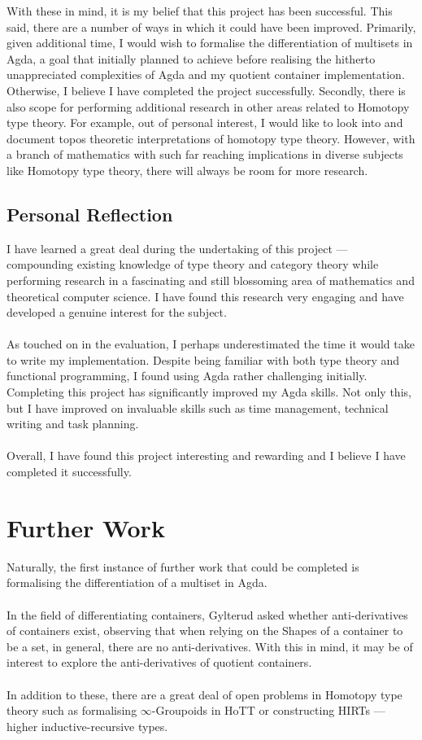 \documentclass[12pt]{report}
\begin{document}
 With these in mind, it is my belief that this project has been successful. This said, there are a number of ways in which it could have been improved. Primarily, given additional time, I would wish to formalise the differentiation of multisets in Agda, a goal that initially planned to achieve before realising the hitherto unappreciated complexities of Agda and my quotient container implementation. Otherwise, I believe I have completed the project successfully. Secondly, there is also scope for performing additional research in other areas related to Homotopy type theory. For example, out of personal interest, I would like to look into and document topos theoretic interpretations of homotopy type theory. However, with a branch of mathematics with such far reaching implications in diverse subjects like Homotopy type theory, there will always be room for more research.

\section{Personal Reflection}
I have learned a great deal during the undertaking of this project --- compounding existing knowledge of type theory and category theory while performing research in a fascinating and still blossoming area of mathematics and theoretical computer science. I have found this research very engaging and have developed a genuine interest for the subject.\\
\\
As touched on in the evaluation, I perhaps underestimated the time it would take to write my implementation. Despite being familiar with both type theory and functional programming, I found using Agda rather challenging initially. Completing this project has significantly improved my Agda skills. Not only this, but I have improved on invaluable skills such as time management, technical writing and task planning.\\
\\
Overall, I have found this project interesting and rewarding and I believe I have completed it successfully.

\chapter{Further Work}
Naturally, the first instance of further work that could be completed is formalising the differentiation of a multiset in Agda. \\
\\
In the field of differentiating containers, Gylterud asked whether anti-derivatives of containers exist, observing that when relying on the Shapes of a container to be a set, in general, there are no anti-derivatives. With this in mind, it may be of interest to explore the anti-derivatives of quotient containers.\\
\\
In addition to these, there are a great deal of open problems in Homotopy type theory such as formalising  $\infty$-Groupoids in HoTT or constructing HIRTs --- higher inductive-recursive types. 
\end{document}
